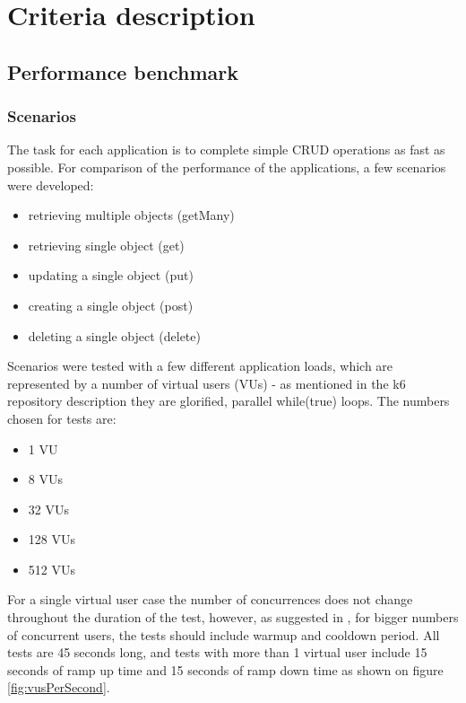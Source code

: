 
\chapter{Criteria description}

\section{Performance benchmark}

\subsection{Scenarios}
The task for each application is to complete simple CRUD operations as fast as possible. For comparison of the performance of the applications, a few scenarios were developed:

\begin{itemize}
    \item retrieving multiple objects (getMany)
    \item retrieving single object (get)
    \item updating a single object (put)
    \item creating a single object (post)
    \item deleting a single object (delete)
\end{itemize}

Scenarios were tested with a few different application loads, which are represented by a number of virtual users (VUs) - as mentioned in the k6 repository description they are glorified, parallel while(true) loops.
The numbers chosen for tests are:
\begin{itemize}
    \item 1 VU
    \item 8 VUs
    \item 32 VUs
    \item 128 VUs
    \item 512 VUs
\end{itemize}
For a single virtual user case the number of concurrences does not change throughout the duration of the test, however, as suggested in
, for bigger numbers of concurrent users, the tests should include warmup and cooldown period. All tests are 45 seconds long, and tests with more than 1 virtual user include 15 seconds of ramp up time and 15 seconds of ramp down time as shown on figure \ref{fig:vusPerSecond}.

